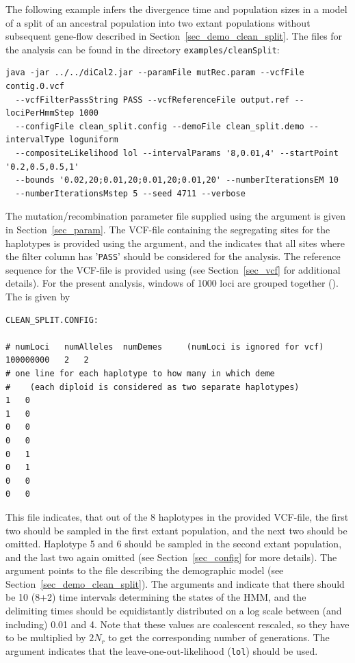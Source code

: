 \documentclass{article}
\numberwithin{equation}{section}
\begin{document}
The following example infers the divergence time and population sizes in a model of a split of an ancestral population into two extant populations without subsequent gene-flow described in Section~\ref{sec_demo_clean_split}. The files for the analysis can be found in the directory \texttt{examples/cleanSplit}:

\begin{verbatim}
java -jar ../../diCal2.jar --paramFile mutRec.param --vcfFile contig.0.vcf
  --vcfFilterPassString PASS --vcfReferenceFile output.ref --lociPerHmmStep 1000
  --configFile clean_split.config --demoFile clean_split.demo --intervalType loguniform
  --compositeLikelihood lol --intervalParams '8,0.01,4' --startPoint '0.2,0.5,0.5,1'
  --bounds '0.02,20;0.01,20;0.01,20;0.01,20' --numberIterationsEM 10
  --numberIterationsMstep 5 --seed 4711 --verbose
\end{verbatim}

The mutation/recombination parameter file supplied using the  argument is given in Section~\ref{sec_param}. The VCF-file containing the segregating sites for the haplotypes is provided using the  argument, and the  indicates that all sites where the filter column has '\texttt{PASS}' should be considered for the analysis. The reference sequence for the VCF-file is provided using  (see Section~\ref{sec_vcf} for additional details). For the present analysis, windows of 1000 loci are grouped together (). The  is given by

\begin{verbatim}
CLEAN_SPLIT.CONFIG:

# numLoci	numAlleles	numDemes	 (numLoci is ignored for vcf)
100000000	2	2
# one line for each haplotype to how many in which deme
#    (each diploid is considered as two separate haplotypes)
1	0
1	0
0	0
0	0
0	1
0	1
0	0
0	0
\end{verbatim}

This file indicates, that out of the 8 haplotypes in the provided VCF-file, the first two should be sampled in the first extant population, and the next two should be omitted. Haplotype 5 and 6 should be sampled in the second extant population, and the last two again omitted (see Section~\ref{sec_config} for more details). The argument  points to the file describing the demographic model (see Section~\ref{sec_demo_clean_split}). The arguments  and  indicate that there should be 10 (8+2) time intervals determining the states of the HMM, and the delimiting times should be equidistantly distributed on a log scale between (and including) 0.01 and 4. Note that these values are coalescent rescaled, so they have to be multiplied by $2N_r$ to get the corresponding number of generations. The argument  indicates that the leave-one-out-likelihood (\texttt{lol}) should be used.
\end{document}
